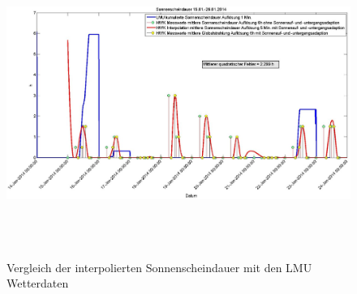 \begin{figure}
\centering
\includegraphics[width=16cm,height=10cm]{analyse/sonnensdauer2}
\caption{Vergleich der interpolierten Sonnenscheindauer mit den LMU Wetterdaten}
\label{fig:sonnensdauer}
\end{figure}

